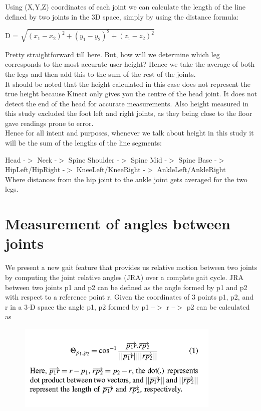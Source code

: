 \noindent Using (X,Y,Z) coordinates of each joint we can calculate the length of the line defined by two joints in the 3D space, simply by using the distance formula:

 D = $\sqrt{(x_{1}-x_{2})^2+ (y_{1}-y_{2})^2+(z_{1}-z_{2})^2}$

\noindent Pretty straightforward till here. But, how will we determine which leg corresponds to the most accurate user height? Hence we take the average of both the legs and then add this to the sum of the rest of the joints.\\
It should be noted that the height calculated in this case does not represent the true height because Kinect only gives you the centre of the head joint. It does not detect the end of the head for accurate measurements. Also height measured in this study excluded the foot left and right joints, as they being close to the floor gave readings prone to error.\\
Hence for all intent and purposes, whenever we talk about height in this study it will be the sum of the lengths of the line segments:

\noindent Head -$>$ Neck -$>$ Spine Shoulder -$>$ Spine Mid -$>$ Spine Base -$>$ HipLeft/HipRight -$>$ KneeLeft/KneeRight -$>$ AnkleLeft/AnkleRight\\ 
Where distances from the hip joint to the ankle joint gets averaged for the two legs.
\newpage
\section{ Measurement of angles between joints} \label{ Measurement of angles between joints}
We present a new gait feature that provides us relative motion between two joints by computing the joint relative angles (JRA) over a complete gait cycle. JRA between two joints p1 and p2 can be defined as the angle formed by p1 and p2 with respect to a reference point r. Given the coordinates of 3 points p1, p2, and r in a 3-D space the angle p1, p2 formed by p1 --$>$ r --$>$ p2 can be calculated as

\begin{figure}[h]
\centering
\includegraphics[scale=1.25]{equation.png}
\end{figure}

